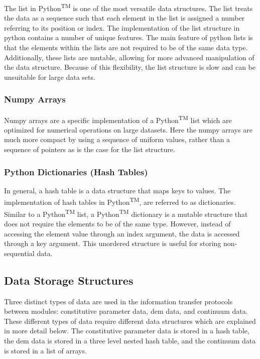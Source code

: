 The list in Python\textsuperscript{TM} is one of the most versatile data structures. The list treats the data as a sequence such that each element in the list is assigned a number referring to its position or index.  The implementation of the list structure in python contains a number of unique features. The main feature of python lists is that the elements within the lists are not required to be of the same data type. Additionally, these lists are mutable, allowing for more advanced manipulation of the data structure. Because of this flexibility, the list structure is slow and can be unsuitable for large data sets. 

\subsubsection*{Numpy Arrays}

Numpy arrays are a specific implementation of a Python\textsuperscript{TM} list which are optimized for numerical operations on large datasets. Here the numpy arrays are much more compact by using a sequence of uniform values, rather than a sequence of pointers as is the case for the list structure.

\subsubsection*{Python Dictionaries (Hash Tables)}

In general, a hash table is a data structure that maps keys to values. The implementation of hash tables in Python\textsuperscript{TM}, are referred to as dictionaries. Similar to a Python\textsuperscript{TM} list, a Python\textsuperscript{TM} dictionary is a mutable structure that does not require the elements to be of the same type. However, instead of accessing the element value through an index argument, the data is accessed through a key argument. This unordered structure is useful for storing non-sequential data.

\subsection{Data Storage Structures}

Three distinct types of data are used in the information transfer protocols between modules: constitutive parameter data, \acrshort{dem} data, and continuum data. These different types of data require different data structures which are explained in more detail below. The constitutive parameter data is stored in a hash table, the \acrshort{dem} data is stored in a three level nested hash table, and the continuum data is stored in a list of arrays.

